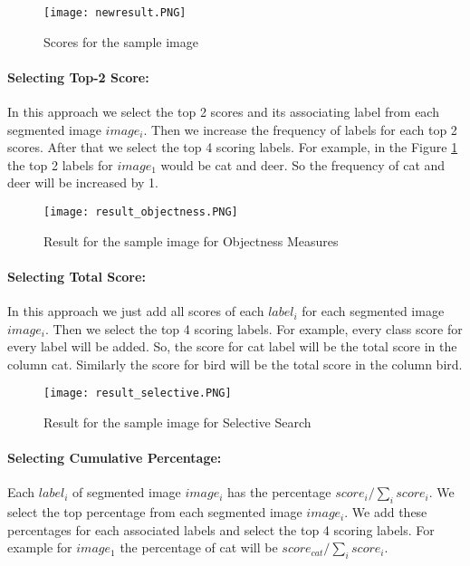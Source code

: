 \begin{figure}[h!]
  \centering
  \texttt{[image: newresult.PNG]}
  \caption{Scores for the sample image}\label{score}
\end{figure}

\paragraph{Selecting Top-2 Score:}
In this approach we select the top 2 scores and its associating label from each segmented image $image_{i}$. Then we increase the frequency of labels for each top 2 scores. After that we select the top 4 scoring labels.  For example, in the Figure \ref{score} the top 2 labels for $image_{1}$ would be cat and deer. So the frequency of cat and deer will be increased by 1.

\begin{figure}[h!]
  \centering
  \texttt{[image: result\_objectness.PNG]}
  \caption{Result for the sample image for Objectness Measures}\label{resobj}
\end{figure}

\paragraph{Selecting Total Score:}
In this approach we just add all scores of each $label_{i}$ for each segmented image $image_{i}$. Then we select the top 4 scoring labels. For example, every class score for every label will be added. So, the score for cat label will be the total score in the column cat. Similarly the score for bird will be the total score in the column bird.

\begin{figure}[h!]
  \centering
  \texttt{[image: result\_selective.PNG]}
  \caption{Result for the sample image for Selective Search}\label{ressel}
\end{figure}



\paragraph{Selecting Cumulative Percentage:}
Each $label_{i}$ of segmented image $image_{i}$ has the percentage $score_{i} / \sum_{i}{score_{i}}$. We select the top percentage from each segmented image $image_{i}$. We add these percentages for each associated labels and select the top 4 scoring labels. For example for $image_{1}$ the percentage of cat will be $score_{cat} / \sum_{i}{score_{i}}$.\hfill \break

